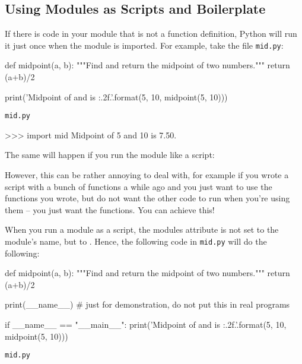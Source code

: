 \documentclass[11pt]{cselabheader}
\begin{document}
\subsection{Using Modules as Scripts and Boilerplate}

If there is code in your module that is not a function definition, Python will
run it just once when the module is imported. For example, take the file
\texttt{mid.py}:

\begin{listing}[H]
  \vspace{-0.5em}
\begin{python3code}
def midpoint(a, b):
    """Find and return the midpoint of two numbers."""
    return (a+b)/2

print('Midpoint of {} and {} is {:.2f}.'.format(5, 10, midpoint(5, 10)))
\end{python3code}
  \vspace{-1em}
  \caption{\texttt{mid.py}}
  \vspace{-0.5em}
\end{listing}

\begin{pyconcode}
>>> import mid
Midpoint of 5 and 10 is 7.50.
\end{pyconcode}

The same will happen if you run the module like a script:


However, this can be rather annoying to deal with, for example if you wrote a
script with a bunch of functions a while ago and you just want to use the
functions you wrote, but do not want the other code to run when you're using
them -- you just want the functions. You can achieve this!

When you run a module as a script, the modules  attribute
is not set to the module's name, but to . Hence, the
following code in \texttt{mid.py} will do the following:

\begin{listing}[H]
  \vspace{-0.5em}
\begin{python3code}
def midpoint(a, b):
    """Find and return the midpoint of two numbers."""
    return (a+b)/2

print(__name__) # just for demonstration, do not put this in real programs

if __name__ == "__main__":
    print('Midpoint of {} and {} is {:.2f}.'.format(5, 10, midpoint(5, 10)))
\end{python3code}
  \vspace{-1em}
  \caption{\texttt{mid.py}}
  \vspace{-0.5em}
\end{listing}
\end{document}
